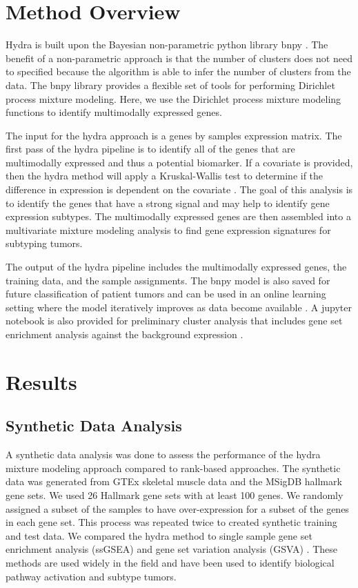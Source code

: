 \documentclass[fleqn,10pt]{wlscirep}
\begin{document}
\section*{Method Overview}

Hydra is built upon the Bayesian non-parametric python library bnpy \cite{hughes2014bnpy}. The benefit of a non-parametric approach is that the number of clusters does not need to specified because the algorithm is able to infer the number of clusters from the data. The bnpy library provides a flexible set of tools for performing Dirichlet process mixture modeling. Here, we use the Dirichlet process mixture modeling functions to identify multimodally expressed genes.

The input for the hydra approach is a genes by samples expression matrix. The first pass of the hydra pipeline is to identify all of the genes that are multimodally expressed and thus a potential biomarker. If a covariate is provided, then the hydra method will apply a Kruskal-Wallis test to determine if the difference in expression is dependent on the covariate \cite{mckight2010kruskal}. The goal of this analysis is to identify the genes that have a strong signal and may help to identify gene expression subtypes. The multimodally expressed genes are then assembled into a multivariate mixture modeling analysis to find gene expression signatures for subtyping tumors.

The output of the hydra pipeline includes the multimodally expressed genes, the training data, and the sample assignments. The bnpy model is also saved for future classification of patient tumors and can be used in an online learning setting where the model iteratively improves as data become available \cite{robert2014machine}. A jupyter notebook is also provided for preliminary cluster analysis that includes gene set enrichment analysis against the background expression \cite{kluyver2016jupyter,sergushichev2016algorithm}.

\section*{Results}

\subsection*{Synthetic Data Analysis}
A synthetic data analysis was done to assess the performance of the hydra mixture modeling approach compared to rank-based approaches. The synthetic data was generated from GTEx skeletal muscle data and the MSigDB hallmark gene sets. We used 26 Hallmark gene sets with at least 100 genes. We randomly assigned a subset of the samples to have over-expression for a subset of the genes in each gene set. This process was repeated twice to created synthetic training and test data. We compared the hydra method to single sample gene set enrichment analysis (ssGSEA) \cite{barbie2009systematic} and gene set variation analysis (GSVA) \cite{hanzelmann2013gsva}. These methods are used widely in the field and have been used to identify biological pathway activation and subtype tumors. 
\end{document}

